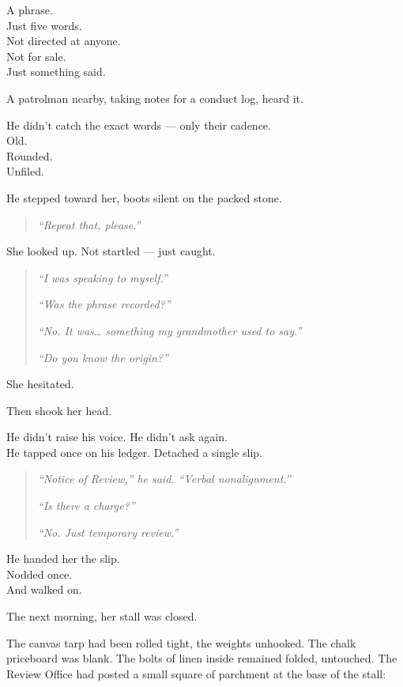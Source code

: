\documentclass[12pt]{article}
\begin{document}
A phrase.\\
Just five words.\\
Not directed at anyone.\\
Not for sale.\\
Just something said.

A patrolman nearby, taking notes for a conduct log, heard it.

He didn’t catch the exact words --- only their cadence.\\
Old.\\
Rounded.\\
Unfiled.

\vspace{1em}

He stepped toward her, boots silent on the packed stone.

\begin{quote}
\textit{“Repeat that, please.”}
\end{quote}

She looked up. Not startled --- just caught.

\begin{quote}
\textit{“I was speaking to myself.”}

\textit{“Was the phrase recorded?”}

\textit{“No. It was… something my grandmother used to say.”}

\textit{“Do you know the origin?”}
\end{quote}

She hesitated.

Then shook her head.

He didn’t raise his voice. He didn’t ask again.\\
He tapped once on his ledger. Detached a single slip.

\begin{quote}
\textit{“Notice of Review,” he said. “Verbal nonalignment.”}

\textit{“Is there a charge?”}

\textit{“No. Just temporary review.”}
\end{quote}

He handed her the slip.\\
Nodded once.\\
And walked on.

\vspace{1em}

The next morning, her stall was closed.

The canvas tarp had been rolled tight, the weights unhooked. The chalk priceboard was blank. The bolts of linen inside remained folded, untouched. The Review Office had posted a small square of parchment at the base of the stall:
\end{document}
